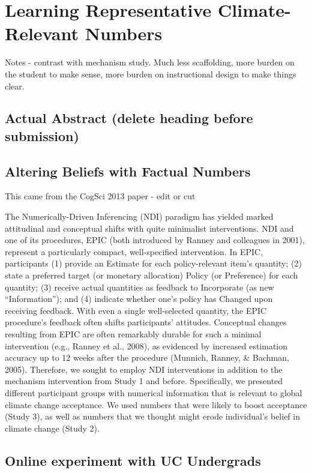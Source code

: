 \graphicspath{{pro-ndi/}}

\chapter{Learning Representative Climate-Relevant Numbers}
\label{chap:prondi}

Notes - contrast with mechanism study. Much less scaffolding, more burden on the
student to make sense, more burden on instructional design to make things clear.

\section{Actual Abstract (delete heading before submission)}

\section{Altering Beliefs with Factual Numbers}

This came from the CogSci 2013 paper - edit or cut

The Numerically-Driven Inferencing (NDI) paradigm has yielded marked
attitudinal and conceptual shifts with quite minimalist interventions. NDI and
one of its procedures, EPIC (both introduced by Ranney and colleagues in 2001),
represent a particularly compact, well-specified intervention. In EPIC,
participants (1) provide an Estimate for each policy-relevant item’s quantity;
(2) state a preferred target (or monetary allocation) Policy (or Preference) for
each quantity; (3) receive actual quantities as feedback to Incorporate (as new
``Information''); and (4) indicate whether one’s policy has Changed upon receiving
feedback. With even a single well-selected quantity, the EPIC procedure’s
feedback often shifts participants’ attitudes. Conceptual changes resulting from
EPIC are often remarkably durable for such a minimal intervention (e.g., Ranney
et al., 2008), as evidenced by increased estimation accuracy up to 12 weeks
after the procedure (Munnich, Ranney, \& Bachman, 2005). Therefore, we sought to
employ NDI interventions in addition to the mechanism intervention from Study 1
and before. Specifically, we presented different participant groups with
numerical information that is relevant to global climate change acceptance. We
used numbers that were likely to boost acceptance (Study 3), as well as numbers
that we thought might erode individual's belief in climate change (Study 2).

\section{Online experiment with UC Undergrads}

